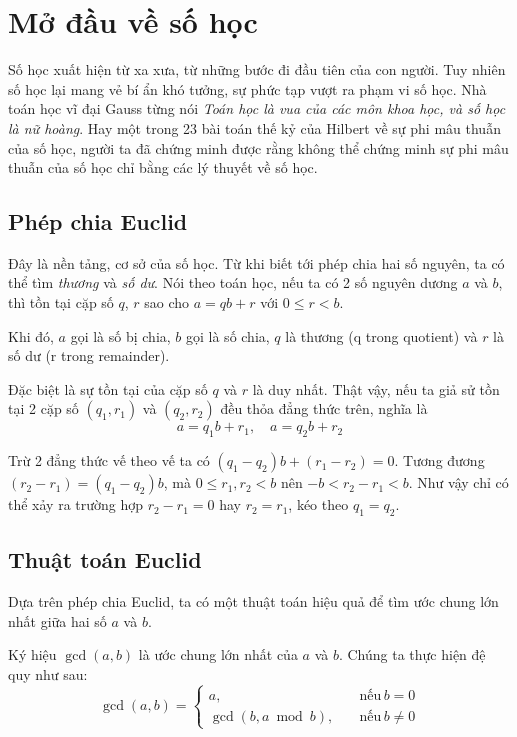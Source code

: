 \chapter{Mở đầu về số học}

Số học xuất hiện từ xa xưa, từ những bước đi đầu tiên của con
người. Tuy nhiên số học lại mang vẻ bí ẩn khó tưởng, sự phức
tạp vượt ra phạm vi số học. Nhà toán học vĩ đại Gauss từng nói
\textit{Toán học là vua của các môn khoa học, và số học là
nữ hoàng}. Hay một trong 23 bài toán thế kỷ của Hilbert về sự
phi mâu thuẫn của số học, người ta đã chứng minh được rằng
không thể chứng minh sự phi mâu thuẫn của số học chỉ bằng các
lý thuyết về số học.

\section{Phép chia Euclid}

Đây là nền tảng, cơ sở của số học. Từ khi biết tới phép chia
hai số nguyên, ta có thể tìm \textit{thương} và \textit{số dư}.
Nói theo toán học, nếu ta có 2 số nguyên dương $a$ và $b$, thì
tồn tại cặp số $q$, $r$ sao cho $a = qb + r$ với $0 \leq r < b$.

Khi đó, $a$ gọi là số bị chia, $b$ gọi là số chia, $q$ là thương
(q trong quotient) và $r$ là số dư (r trong remainder).

Đặc biệt là sự tồn tại của cặp số $q$ và $r$ là duy nhất. Thật
vậy, nếu ta giả sử tồn tại 2 cặp số $(q_1, r_1)$ và $(q_2, r_2)$ 
đều thỏa đẳng thức trên, nghĩa là
\[a = q_1 b + r_1, \quad a = q_2 b + r_2\]

Trừ 2 đẳng thức vế theo vế ta có $(q_1 - q_2) b + (r_1 - r_2) = 0$.
Tương đương $(r_2 - r_1) = (q_1 - q_2) b$, mà $0 \leq r_1, r_2 < b$
nên $-b < r_2 - r_1 < b$. Như vậy chỉ có thể xảy ra trường hợp
$r_2 - r_1 = 0$ hay $r_2 = r_1$, kéo theo $q_1 = q_2$.

\section{Thuật toán Euclid}

Dựa trên phép chia Euclid, ta có một thuật toán hiệu quả để tìm
ước chung lớn nhất giữa hai số $a$ và $b$.

Ký hiệu $\gcd(a, b)$ là ước chung lớn nhất của $a$ và $b$. Chúng 
ta thực hiện đệ quy như sau:
\[\gcd(a, b) = \begin{cases}
    a, \quad & \text{nếu}\,b = 0 \\
    \gcd(b, a \bmod b), \quad & \text{nếu}\,b \neq 0
\end{cases} 
    \]

